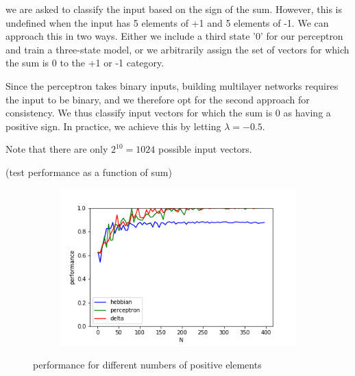 \documentclass{article}
\begin{document}
we are asked to classify the input based on the sign of the sum. However, this is undefined when the input has 5 elements of +1 and 5 elements of -1. We can approach this in two ways. Either we include a third state '0' for our perceptron and train a three-state model, or we arbitrarily assign the set of vectors for which the sum is 0 to the +1 or -1 category.

Since the perceptron takes binary inputs, building multilayer networks requires the input to be binary, and we therefore opt for the second approach for consistency. We thus classify input vectors for which the sum is 0 as having a positive sign. In practice, we achieve this by letting $\lambda = -0.5$.

Note that there are only $2^10 = 1024$ possible input vectors. 

(test performance as a function of sum)


\begin{figure}[h]
	\centering
	\begin{subfigure}[t]{0.62\linewidth}
		\centering
		\includegraphics[width = 1.0\linewidth, trim={0 0 0 0}, clip=true]{figures/compare_sum.png}
	\end{subfigure}%
\caption{performance for different numbers of positive elements}
\label{fig:nplus}
\end{figure}
\end{document}
